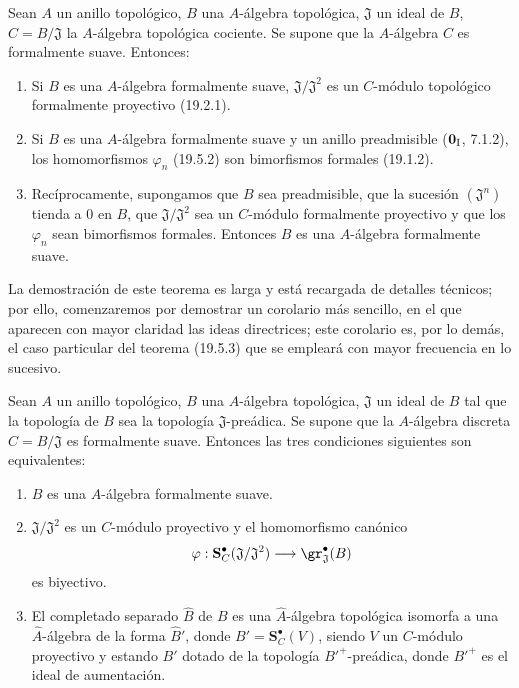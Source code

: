 \begin{theorem}[19.5.3]
\label{0.19.5.3-fr}
Sean $A$ un anillo topológico, $B$ una $A$-álgebra topológica,
$\mathfrak J$ un ideal de $B$, $C=B/\mathfrak J$ la $A$-álgebra topológica
cociente. Se supone que la $A$-álgebra $C$ es formalmente suave.
Entonces:
\begin{enumerate}
  \item[\rm(i)] Si $B$ es una $A$-álgebra formalmente suave,
  $\mathfrak J/\mathfrak J^2$ es un $C$-módulo topológico formalmente
  proyectivo \textup{(19.2.1)}.
  \item[\rm(ii)] Si $B$ es una $A$-álgebra formalmente suave y un anillo
  preadmisible \textup{($\mathbf 0_{\rm I}$, 7.1.2)}, los homomorfismos $\varphi_n$
  \textup{(19.5.2)} son bimorfismos formales \textup{(19.1.2)}.
  \item[\rm(iii)] Recíprocamente, supongamos que $B$ sea preadmisible, que la
  sucesión $(\mathfrak J^n)$ tienda a $0$ en $B$, que
  $\mathfrak J/\mathfrak J^2$ sea un $C$-módulo formalmente proyectivo y que
  los $\varphi_n$ sean bimorfismos formales. Entonces $B$ es una
  $A$-álgebra formalmente suave.
\end{enumerate}
\end{theorem}

La demostración de este teorema es larga y está recargada de detalles técnicos;
por ello, comenzaremos por demostrar un corolario más sencillo, en el que
aparecen con mayor claridad las ideas directrices; este corolario es, por lo demás,
el caso particular del teorema (19.5.3) que se empleará con mayor frecuencia
en lo sucesivo.

\begin{corollary}[19.5.4]
\label{0.19.5.4-fr}
Sean $A$ un anillo topológico, $B$ una $A$-álgebra topológica,
$\mathfrak J$ un ideal de $B$ tal que la topología de $B$ sea la topología
$\mathfrak J$-preádica. Se supone que la $A$-álgebra discreta
$C=B/\mathfrak J$ es formalmente suave. Entonces las tres condiciones siguientes
son equivalentes:
\begin{enumerate}
  \item[\textup{a)}] $B$ es una $A$-álgebra formalmente suave.
  \item[\textup{b)}] $\mathfrak J/\mathfrak J^2$ es un $C$-módulo proyectivo y
  el homomorfismo canónico
  \[
    \varphi:\mathbf S_C^\bullet(\mathfrak J/\mathfrak J^2)
    \longrightarrow\gr_{\mathfrak J}^\bullet(B)
  \]
  es biyectivo.
  \item[\textup{c)}] El completado separado $\widehat B$ de $B$ es una
  $\widehat A$-álgebra topológica isomorfa a una $\widehat A$-álgebra de la
  forma $\widehat{B}'$, donde $B'=\mathbf S_C^\bullet(V)$, siendo $V$ un $C$-módulo
  proyectivo y estando $B'$ dotado de la topología ${B'}^+$-preádica, donde
  ${B'}^+$ es el ideal de aumentación.
\end{enumerate}
\end{corollary}

